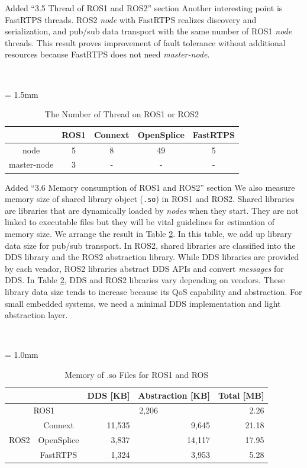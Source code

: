 \documentclass{article}
\begin{document}
\begin{enumerate}
\begin{itembox}[|]{Added ``3.5 Thread of ROS1 and ROS2'' section}
    Another interesting point is FastRTPS threads.
    ROS2 \emph{node} with FastRTPS realizes discovery and serialization, and pub/sub data transport with the same number of ROS1 \emph{node} threads.
    This result proves improvement of fault tolerance without additional resources because FastRTPS does not need \emph{master-node}.
  \end{itembox}\\
  \setcounter{table}{5}
  \begin{table}[H]
    \caption{\label{tb:thread}The Number of Thread on ROS1 or ROS2}
    \centering
    \tabcolsep = 1.5mm              %
    \begin{tabular}{c|cccc}
      \hline
      & ROS1 & Connext & OpenSplice & FastRTPS \\
      \hline
      \hline
      node & 5 & 8 & 49 & 5 \\
      master-node & 3 & - & - & - \\
      \hline
    \end{tabular}
  \end{table}
  \begin{itembox}[|]{Added ``3.6 Memory consumption of ROS1 and ROS2'' section}
    We also measure memory size of shared library object (\texttt{.so}) in ROS1 and ROS2.
    Shared libraries are libraries that are dynamically loaded by \emph{nodes} when they start.
    They are not linked to executable files but they will be vital guidelines for estimation of memory size.
    We arrange the result in Table \ref{tb:memory}.
    In this table, we add up library data size for pub/sub transport.
    In ROS2, shared libraries are classified into the DDS library and the ROS2 abstraction library.
    While DDS libraries are provided by each vendor, ROS2 libraries abstract DDS APIs and convert \emph{messages} for DDS.
    In Table \ref{tb:memory}, DDS and ROS2 libraries vary depending on vendors.
    These library data size tends to increase because its QoS capability and abstraction.
    For small embedded systems, we need a minimal DDS implementation and light abstraction layer.
  \end{itembox}\\
  \begin{table}[H]
    \caption{Memory of .so Files for ROS1 and ROS} 
    \centering
    \renewcommand{\arraystretch}{1.15}
    \label{tb:memory}
    \small
    \tabcolsep = 1.0mm              %
    \begin{tabular}{c|c||r|r||r}
      \hline
      \multicolumn{2}{c||}{} & DDS [KB] & Abstraction [KB] & Total [MB] \\ \hline \hline
      \multicolumn{2}{c||}{ROS1}  & \multicolumn{2}{c||}{ 2,206 } & 2.26 \\ \hline
      \multirow{3}{*}{ROS2} & Connext & 11,535 & 9,645 & 21.18 \\ 
      & OpenSplice & 3,837 & 14,117 & 17.95 \\ 
      & FastRTPS & 1,324 & 3,953 & 5.28\\ \hline
    \end{tabular}
  \end{table}


\end{enumerate}
\end{document}

